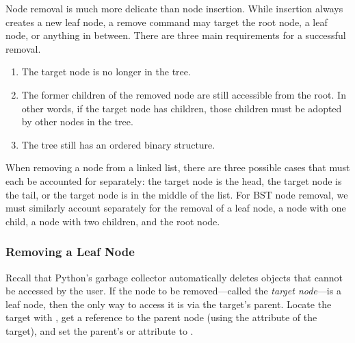 Node removal is much more delicate than node insertion.
While insertion always creates a new leaf node, a remove command may target the root node, a leaf node, or anything in between.
There are three main requirements for a successful removal.
\begin{enumerate}
    \item The target node is no longer in the tree.
    \item The former children of the removed node are still accessible from the root.
    In other words, if the target node has children, those children must be adopted by other nodes in the tree.
    \item The tree still has an ordered binary structure.
\end{enumerate}
When removing a node from a linked list, there are three possible cases that must each be accounted for separately: the target node is the head, the target node is the tail, or the target node is in the middle of the list.
For BST node removal, we must similarly account separately for the removal of a leaf node, a node with one child, a node with two children, and the root node.

\subsubsection*{Removing a Leaf Node} %

Recall that Python's garbage collector automatically deletes objects that cannot be accessed by the user.
If the node to be removed---called the \emph{target node}---is a leaf node, then the only way to access it is via the target's parent.
Locate the target with , get a reference to the parent node (using the  attribute of the target), and set the parent's  or  attribute to .

